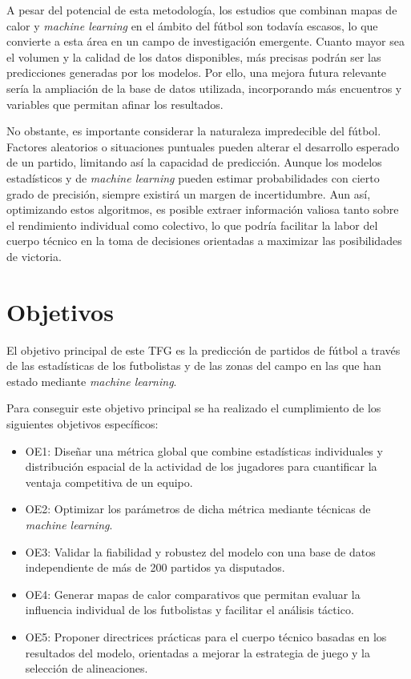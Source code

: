 A pesar del potencial de esta metodología, los estudios que combinan mapas de calor y \textit{machine learning} en el ámbito del fútbol son todavía escasos, lo que convierte a esta área en un campo de investigación emergente. Cuanto mayor sea el volumen y la calidad de los datos disponibles, más precisas podrán ser las predicciones generadas por los modelos. Por ello, una mejora futura relevante sería la ampliación de la base de datos utilizada, incorporando más encuentros y variables que permitan afinar los resultados.

No obstante, es importante considerar la naturaleza impredecible del fútbol. Factores aleatorios o situaciones puntuales pueden alterar el desarrollo esperado de un partido, limitando así la capacidad de predicción. Aunque los modelos estadísticos y de \textit{machine learning} pueden estimar probabilidades con cierto grado de precisión, siempre existirá un margen de incertidumbre. Aun así, optimizando estos algoritmos, es posible extraer información valiosa tanto sobre el rendimiento individual como colectivo, lo que podría facilitar la labor del cuerpo técnico en la toma de decisiones orientadas a maximizar las posibilidades de victoria.

\section{Objetivos}
El objetivo principal de este TFG es la predicción de partidos de fútbol a través de las estadísticas de los futbolistas y de las zonas del campo en las que han estado mediante \textit{machine learning}.

Para conseguir este objetivo principal se ha realizado el cumplimiento de los siguientes objetivos específicos:
\begin{itemize}

  \item OE1: Diseñar una métrica global que combine estadísticas individuales y distribución espacial de la actividad de los jugadores para cuantificar la ventaja competitiva de un equipo.
  \item OE2: Optimizar los parámetros de dicha métrica mediante técnicas de \textit{machine learning}.
  \item OE3: Validar la fiabilidad y robustez del modelo con una base de datos independiente de más de 200 partidos ya disputados.
  \item OE4: Generar mapas de calor comparativos que permitan evaluar la influencia individual de los futbolistas y facilitar el análisis táctico.
  \item OE5: Proponer directrices prácticas para el cuerpo técnico basadas en los resultados del modelo, orientadas a mejorar la estrategia de juego y la selección de alineaciones.
    
\end{itemize}

